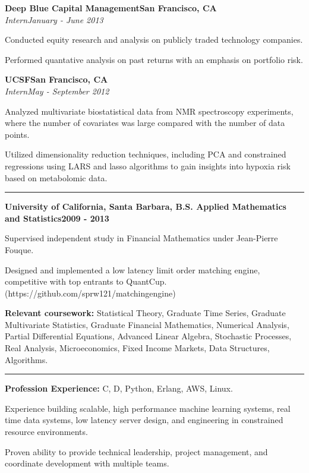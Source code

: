 \documentclass{article}
\newcommand{\ressection}[1]{\noindent{\large\textbf{#1}}\vspace{2pt}\hrule\vspace{4pt}}
\newcommand{\leftandright}[2]{\noindent\textbf{#1}\hfill\textbf{#2}}
\newcommand{\leftandrighti}[2]{\indent\textit{#1}\hfill\textit{#2}}
\begin{document}
\leftandright{Deep Blue Capital Management}{San Francisco, CA} \\
\leftandrighti{Intern}{January - June 2013}

\begin{itemize*}
\item Conducted equity research and analysis on publicly traded technology companies.
\item Performed quantative analysis on past returns with an emphasis on portfolio risk.
\end{itemize*}

\leftandright{UCSF}{San Francisco, CA} \\
\leftandrighti{Intern}{May - September 2012}
\begin{itemize*}
\item Analyzed multivariate biostatistical data from NMR spectroscopy experiments, where
  the number of covariates was large compared with the number of data points.
\item Utilized dimensionality reduction techniques, including PCA and constrained regressions
  using LARS and lasso algorithms to gain insights into hypoxia risk based on metabolomic data.
\end{itemize*}

\ressection{Education}

\leftandright{University of California, Santa Barbara, \textmd{B.S. Applied
    Mathematics and Statistics}}{2009 - 2013}
\begin{itemize*}
\item Supervised independent study in Financial Mathematics under Jean-Pierre Fouque.
\item Designed and implemented a low latency limit order matching engine,
  competitive with top entrants to QuantCup.
  (https://github.com/sprw121/matching\textunderscore engine)
\item \textbf{Relevant coursework:} Statistical Theory, Graduate Time Series,
  Graduate Multivariate Statistics, Graduate Financial Mathematics,
  Numerical Analysis, Partial Differential Equations,
  Advanced Linear Algebra, Stochastic Processes, Real Analysis,
  Microeconomics, Fixed Income Markets, Data Structures, Algorithms.
\end{itemize*}

\vspace{1.0em}

\vspace{1.0em}

\ressection{Skills}

\begin{itemize*}
\item \textbf{Profession Experience:} C, D, Python, Erlang, AWS, Linux.
\item Experience building scalable, high performance machine learning systems,
  real time data systems, low latency server design, and engineering in
  constrained resource environments.
\item Proven ability to provide technical leadership, project management,
  and coordinate development with multiple teams.
\end{itemize*}
\end{document}
